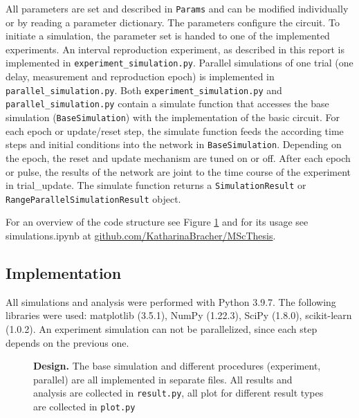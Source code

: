 \documentclass[10pt]{article}
\begin{document}
All parameters are set and described in \texttt{Params} and can be modified individually or by reading a parameter dictionary. The parameters configure the circuit. 
To initiate a simulation, the parameter set is handed to one of the implemented experiments. 
An interval reproduction experiment, as described in this report is implemented in \texttt{experiment\_simulation.py}. 
Parallel simulations of one trial (one delay, measurement and reproduction epoch) is implemented in \texttt{parallel\_simulation.py}.
Both \texttt{experiment\_simulation.py} and \texttt{parallel\_simulation.py} contain a simulate function that accesses the base simulation (\texttt{BaseSimulation}) with the implementation of the basic circuit.
For each epoch or update/reset step, the simulate function feeds the according time steps and initial conditions into the network in \texttt{BaseSimulation}. Depending on the epoch, the reset and update mechanism are tuned on or off. 
After each epoch or pulse, the results of the network are joint to the time course of the experiment in trial\_update. The simulate function returns a \texttt{SimulationResult} or \texttt{RangeParallelSimulationResult} object.

For an overview of the code structure see Figure \ref{fig:code} and for its usage see simulations.ipynb at \href{https://github.com/KatharinaBracher/MScThesis}{github.com/KatharinaBracher/MScThesis}. 

\subsection*{Implementation}
All simulations and analysis were performed with Python 3.9.7. 
The following libraries were used: matplotlib (3.5.1), NumPy (1.22.3), SciPy (1.8.0), scikit-learn (1.0.2). 
An experiment simulation can not be parallelized, since each step depends on the previous one.


\begin{figure}[ht]
	\vspace*{-2cm}
	\caption{\textbf{Design.} The base simulation and different procedures (experiment, parallel) are all implemented in separate files. All results and analysis are collected in \texttt{result.py}, all plot for different result types are collected in \texttt{plot.py}}
\label{fig:code}
\end{figure}


\clearpage
{}
\printbibliography
\end{document}
